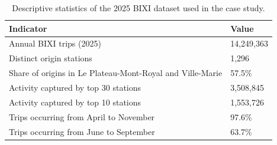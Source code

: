\begin{table}[h!]
  \centering
  \caption{Descriptive statistics of the 2025 BIXI dataset used in the case study.}
  \label{tab:bixi_data_summary}
  \small
  \begin{tabularx}{0.82\textwidth}{@{} l X @{} }
    \hline
    \textbf{Indicator} & \textbf{Value} \\
    \hline
    Annual BIXI trips (2025) & 14,249,363 \\
    Distinct origin stations & 1,296 \\
    Share of origins in Le Plateau-Mont-Royal and Ville-Marie & 57.5\% \\
    Activity captured by top 30 stations & 3,508,845 \\
    Activity captured by top 10 stations & 1,553,726 \\
    Trips occurring from April to November & 97.6\% \\
    Trips occurring from June to September & 63.7\% \\
    \hline
  \end{tabularx}
\end{table}
